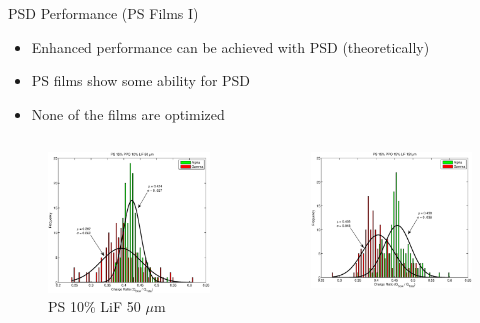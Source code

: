 \begin{frame}{PSD Performance (PS Films I)}
\small
\begin{itemize}
	\item Enhanced performance can be achieved with PSD (theoretically)
	\item PS films show some ability for PSD
	\item None of the films are optimized \cite{zaitseva_plastic_2012}
\end{itemize}
\begin{columns}[onlytextwidth]
\begin{column}{0.30\textwidth}
	\tiny
	\begin{figure}
		\centering
		\includegraphics[width=\textwidth]{images/ChargeIntegration_PS_LiF_POP_50um.eps}
		\caption{PS 10\% LiF 50 $\mu$m}
	\end{figure}
\end{column}
\begin{column}{0.30\textwidth}
	\tiny
	\begin{figure}
		\centering
		\includegraphics[width=\textwidth]{images/ChargeIntegration_PS_LiF_POP_151um.eps}

\end{figure}
\end{column}
\end{columns}
\end{frame}

